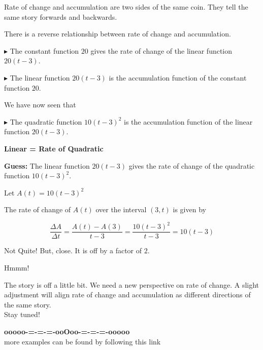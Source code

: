 \documentclass{ximera}
\begin{document}
Rate of change and accumulation are two sides of the same coin.  They tell the same story forwards and backwards.



There is a reverse relationship between rate of change and accumulation.


$\blacktriangleright$ The constant function $20$ gives the rate of change of the linear function $20(t-3)$.


$\blacktriangleright$ The linear function $20(t-3)$ is the accumulation function of the constant function $20$.




We have now seen that 

$\blacktriangleright$ The quadratic function $10(t-3)^2$ is the accumulation function of the linear function $20(t-3)$. 





\begin{idea} \textbf{\textcolor{blue!55!black}{Linear = Rate of Quadratic}} 


\textbf{\textcolor{blue!55!black}{Guess:}} The linear function $20(t-3)$ gives the rate of change of the quadratic function $10(t-3)^2$.





Let $A(t) = 10 (t-3)^2$


The rate of change of $A(t)$ over the interval $(3, t)$ is given by




\[
\frac{\Delta A}{\Delta t} = \frac{A(t) - A(3)}{t-3} = \frac{10 (t-3)^2}{t-3} = 10(t-3)
\]


Not Quite!  But, close.  It is off by a factor of $2$.  




Hmmm!


\end{idea}













The story is off a little bit. We need a new perspective on rate of change.  A slight adjustment will align rate of change and accumulation as different directions of the same story. \\

Stay tuned!







\begin{onlineOnly}
\begin{center}
\textbf{\textcolor{green!50!black}{ooooo-=-=-=-ooOoo-=-=-=-ooooo}} \\

more examples can be found by following this link\\ 

\end{center}
\end{onlineOnly}
\end{document}
